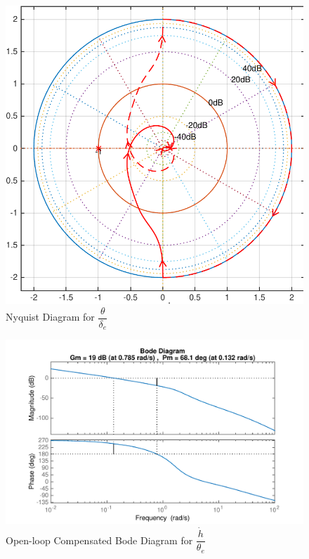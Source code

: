 \documentclass[11pt]{article}
\begin{document}
\begin{figure}[h!]
\begin{center}
\includegraphics[height=.4\textheight]{figures/nyquist_hdot}
\caption{Nyquist Diagram for $\dfrac{\theta}{\delta_e}$}
\end{center}
\end{figure}

\begin{figure}[h!]
\begin{center}
\includegraphics[height=.4\textheight]{figures/open_comp_hdot}
\caption{Open-loop Compensated Bode Diagram for $\dfrac{\dot{h}}{\theta_e}$}
\end{center}
\end{figure}
\end{document}
